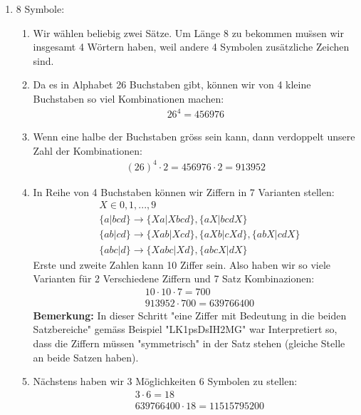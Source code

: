 	\begin{enumerate}[label=(\alph*)]
		\item 8 Symbole:
		\begin{enumerate}[label=\bfseries Schritt \arabic*:]
			\item Wir w\"ahlen beliebig zwei S\"atze. Um L\"ange 8 zu bekommen mu\"ssen wir insgesamt 4 W\"ortern haben,
			weil andere 4 Symbolen zus\"atzliche Zeichen sind.

			\item Da es in Alphabet 26 Buchstaben gibt, k\"onnen wir von 4 kleine Buchstaben so viel Kombinationen machen:
			\begin{align*}
				26^4=456976
			\end{align*}

			\item Wenn eine halbe der Buchstaben gr\"oss sein kann, dann verdoppelt unsere Zahl der Kombinationen:
			\begin{align*}
				(26)^4\cdot2=456976\cdot2=913952
			\end{align*}

			\item In Reihe von 4 Buchstaben k\"onnen wir Ziffern in 7 Varianten stellen:
			\begin{align*}
				& X \in {0,1,...,9} \\
				& \{a|bcd\} \to \{Xa|Xbcd\},\{aX|bcdX\} \\
				& \{ab|cd\} \to \{Xab|Xcd\},\{aXb|cXd\}, \{abX|cdX\} \\
				& \{abc|d\} \to \{Xabc|Xd\},\{abcX|dX\}
			\end{align*}
			Erste und zweite Zahlen kann 10 Ziffer sein. Also haben wir so viele Varianten f\"ur 2 Verschiedene 
			Ziffern und 7 Satz Kombinazionen:
			\begin{align*}
				& 10\cdot10\cdot7 = 700 \\
				& 913952\cdot700 = 639766400
			\end{align*}
			\textbf{Bemerkung:} In dieser Schritt "eine Ziffer mit Bedeutung in die beiden Satzbereiche" gem\"ass 
			Beispiel "LK1psDsIH2MG" war Interpretiert so, dass die Ziffern m\"ussen "symmetrisch" in der Satz stehen
			(gleiche Stelle an beide Satzen haben). 
			\item N\"achstens haben wir 3 M\"oglichkeiten 6 Symbolen zu stellen:
			\begin{align*}
				& 3\cdot6=18 \\
				& 639766400\cdot18 = 11515795200
			\end{align*}


\end{enumerate}
\end{enumerate}
